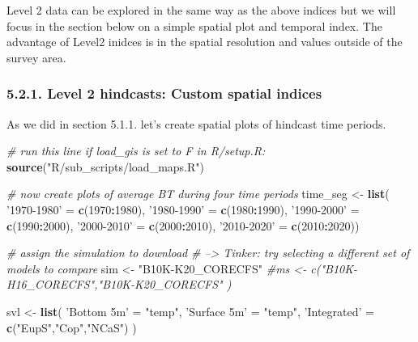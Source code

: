\documentclass[
]{article}
\newenvironment{Shaded}{\begin{snugshade}}{\end{snugshade}}
\newcommand{\CommentTok}[1]{\textcolor[rgb]{0.56,0.35,0.01}{\textit{#1}}}
\newcommand{\DecValTok}[1]{\textcolor[rgb]{0.00,0.00,0.81}{#1}}
\newcommand{\KeywordTok}[1]{\textcolor[rgb]{0.13,0.29,0.53}{\textbf{#1}}}
\newcommand{\NormalTok}[1]{#1}
\newcommand{\OperatorTok}[1]{\textcolor[rgb]{0.81,0.36,0.00}{\textbf{#1}}}
\newcommand{\StringTok}[1]{\textcolor[rgb]{0.31,0.60,0.02}{#1}}
\begin{document}
Level 2 data can be explored in the same way as the above indices but we
will focus in the section below on a simple spatial plot and temporal
index. The advantage of Level2 inidces is in the spatial resolution and
values outside of the survey area.

\hypertarget{level-2-hindcasts-custom-spatial-indices}{%
\subsubsection{5.2.1. Level 2 hindcasts: Custom spatial
indices}\label{level-2-hindcasts-custom-spatial-indices}}

As we did in section 5.1.1. let's create spatial plots of hindcast time
periods.

\begin{Shaded}
\begin{Highlighting}[]
   \CommentTok{# run this line if load_gis is set to F in R/setup.R:}
    \KeywordTok{source}\NormalTok{(}\StringTok{"R/sub_scripts/load_maps.R"}\NormalTok{)  }

    \CommentTok{# now create plots of average BT during four time periods}
\NormalTok{    time_seg   <-}\StringTok{ }\KeywordTok{list}\NormalTok{( }\StringTok{'1970-1980'}\NormalTok{ =}\StringTok{ }\KeywordTok{c}\NormalTok{(}\DecValTok{1970}\OperatorTok{:}\DecValTok{1980}\NormalTok{),}
                        \StringTok{'1980-1990'}\NormalTok{ =}\StringTok{ }\KeywordTok{c}\NormalTok{(}\DecValTok{1980}\OperatorTok{:}\DecValTok{1990}\NormalTok{),}
                        \StringTok{'1990-2000'}\NormalTok{ =}\StringTok{ }\KeywordTok{c}\NormalTok{(}\DecValTok{1990}\OperatorTok{:}\DecValTok{2000}\NormalTok{),}
                        \StringTok{'2000-2010'}\NormalTok{ =}\StringTok{ }\KeywordTok{c}\NormalTok{(}\DecValTok{2000}\OperatorTok{:}\DecValTok{2010}\NormalTok{),}
                        \StringTok{'2010-2020'}\NormalTok{ =}\StringTok{ }\KeywordTok{c}\NormalTok{(}\DecValTok{2010}\OperatorTok{:}\DecValTok{2020}\NormalTok{))}
    
   
    \CommentTok{# assign the simulation to download}
    \CommentTok{# --> Tinker: try selecting a different set of models to compare}
\NormalTok{    sim        <-}\StringTok{ "B10K-K20_CORECFS"} 
    \CommentTok{#ms <- c("B10K-H16_CORECFS","B10K-K20_CORECFS" )}
   
\NormalTok{    svl <-}\StringTok{ }\KeywordTok{list}\NormalTok{(}
      \StringTok{'Bottom 5m'}\NormalTok{ =}\StringTok{ "temp"}\NormalTok{,}
      \StringTok{'Surface 5m'}\NormalTok{ =}\StringTok{ "temp"}\NormalTok{,}
      \StringTok{'Integrated'}\NormalTok{ =}\StringTok{ }\KeywordTok{c}\NormalTok{(}\StringTok{"EupS"}\NormalTok{,}\StringTok{"Cop"}\NormalTok{,}\StringTok{"NCaS"}\NormalTok{) ) }
   

\end{Highlighting}
\end{Shaded}
\end{document}
